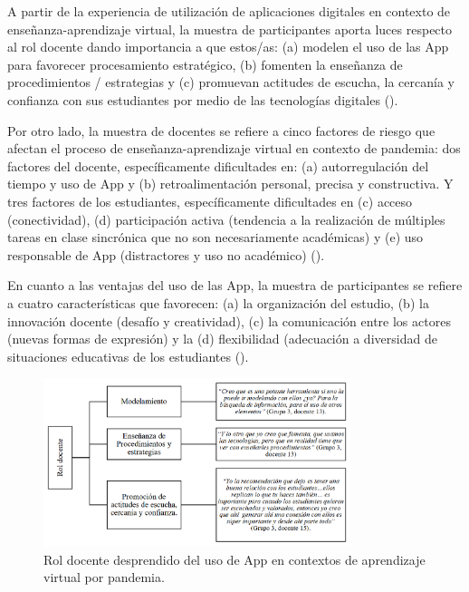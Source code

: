 \documentclass[spanish]{textolivre}
\begin{document}
A partir de la experiencia de utilización de aplicaciones digitales en contexto de enseñanza-aprendizaje virtual, la muestra de participantes aporta luces respecto al rol docente dando importancia a que estos/as: (a) modelen el uso de las App para favorecer procesamiento estratégico, (b) fomenten la enseñanza de procedimientos / estrategias y (c) promuevan actitudes de escucha, la cercanía y confianza con sus estudiantes por medio de las tecnologías digitales ().

Por otro lado, la muestra de docentes se refiere a cinco factores de riesgo que afectan el proceso de enseñanza-aprendizaje virtual en contexto de pandemia: dos factores del docente, específicamente dificultades en: (a) autorregulación del tiempo y uso de App y (b) retroalimentación personal, precisa y constructiva. Y tres factores de los  estudiantes, específicamente dificultades en (c) acceso (conectividad), (d) participación activa (tendencia a la realización de múltiples tareas en clase sincrónica que no son necesariamente académicas) y (e) uso responsable de App (distractores y uso no académico) ().

En cuanto a las ventajas del uso de las App, la muestra de participantes se refiere a cuatro características que favorecen: (a) la organización del estudio, (b) la innovación docente (desafío y creatividad), (c) la comunicación entre los actores (nuevas formas de expresión) y la (d) flexibilidad (adecuación a diversidad de situaciones educativas de los  estudiantes ().

\begin{figure}[htbp]
 \centering
 \includegraphics[width=0.8\textwidth]{fig33a.png}
 \caption{Rol docente desprendido del uso de App en contextos de aprendizaje virtual por pandemia.}
 \label{fig33a}
\end{figure}
\end{document}
